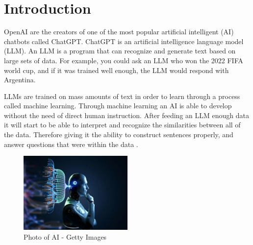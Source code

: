 \section{Introduction}
\label{sec:ai}


OpenAI are the creators of one of the most popular artificial intelligent (AI) chatbots called ChatGPT. ChatGPT is an artificial intelligence language model (LLM). An LLM is a program that can recognize and generate text based on large sets of data. For example, you could ask an LLM who won the 2022 FIFA world cup, and if it was trained well enough, the LLM would respond with Argentina. 
   
LLMs are trained on mass amounts of text in order to learn through a process called machine learning. Through machine learning an AI is able to develop without the need of direct human instruction. After feeding an LLM enough data it will start to be able to interpret and recognize the similarities between all of the data. Therefore giving it the ability to construct sentences properly, and answer questions that were within the data \citep{ChatGPT-functions} \cite{LLM}.

\begin{figure}[h]
  \centering
  \includegraphics[width=0.5\textwidth]{E.jpg}
  \caption{Photo of AI - Getty Images}
  \label{fig:}
\end{figure}